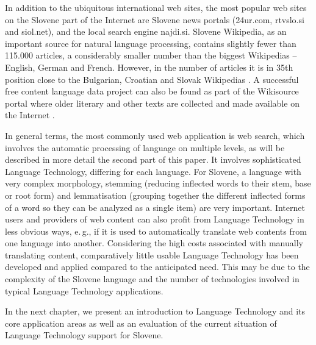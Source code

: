 \begin{multicols}{2}
In addition to the ubiquitous international web sites, the most popular web sites on the Slovene part of the Internet are Slovene news portals (24ur.com, rtvslo.si and siol.net), and the local search engine najdi.si. Slovene Wikipedia, as an important source for natural language processing, contains slightly fewer than 115.000 articles, a considerably smaller number than the biggest Wikipedias – English, German and French. However, in the number of articles it is in 35th position close to the Bulgarian, Croatian and Slovak Wikipedias \cite{Wiki1}.  A successful free content language data project can also be found as part of the Wikisource portal where older literary and other texts are collected and made available on the Internet \cite{Wiki2}.  


In general terms, the most commonly used web application is web search, which involves the automatic processing of language on multiple levels, as will be described in more detail the second part of this paper. It involves sophisticated Language Technology, differing for each language. For Slovene, a language with very complex morphology,   stemming (reducing inflected words to their stem, base or root form) and lemmatisation (grouping together the different inflected forms of a word so they can be analyzed as a single item) are very important. Internet users and providers of web content can also profit from Language Technology in less obvious ways, e.\,g., if it is used to automatically translate web contents from one language into another. Considering the high costs associated with manually translating content, comparatively little usable Language Technology has been developed and applied compared to the anticipated need. This may be due to the complexity of the Slovene language and the number of technologies involved in typical Language Technology applications. 

In the next chapter, we present an introduction to Language Technology and its core application areas as well as an evaluation of the current situation of Language Technology support for Slovene. 
\end{multicols}

\clearpage


